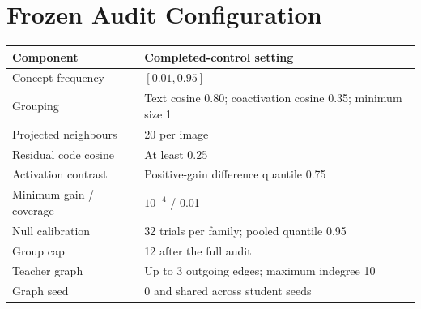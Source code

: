 \documentclass{article}
\begin{document}
\section{Frozen Audit Configuration}
\label{app:provenance}
\begin{table}[ht]
\centering
\begin{tabularx}{\linewidth}{lX}
\toprule
Component & Completed-control setting \\
\midrule
Concept frequency & $[0.01,0.95]$ \\
Grouping & Text cosine 0.80; coactivation cosine 0.35; minimum size 1 \\
Projected neighbours & 20 per image \\
Residual code cosine & At least 0.25 \\
Activation contrast & Positive-gain difference quantile 0.75 \\
Minimum gain / coverage & $10^{-4}$ / 0.01 \\
Null calibration & 32 trials per family; pooled quantile 0.95 \\
Group cap & 12 after the full audit \\
Teacher graph & Up to 3 outgoing edges; maximum indegree 10 \\
Graph seed & 0 and shared across student seeds \\
\bottomrule
\end{tabularx}
\end{table}
\end{document}
